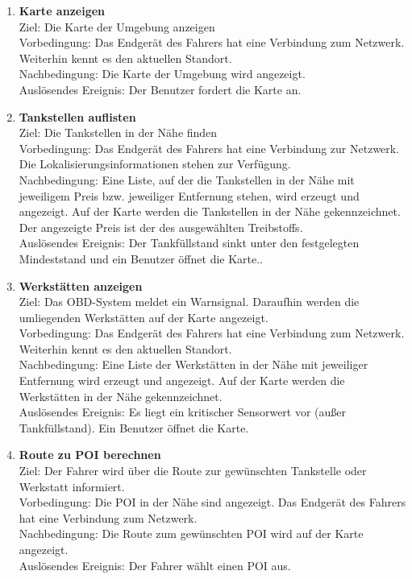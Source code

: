 \documentclass[pflichtenheft.tex]{subfiles}
\begin{document}
	\begin{enumerate}
	\setcounter{enumi}{\value{enumTemp}}
	\item{\textbf{Karte anzeigen}}
		\\Ziel: Die Karte der Umgebung anzeigen
		\\Vorbedingung: Das Endgerät des Fahrers hat eine Verbindung zum Netzwerk. Weiterhin kennt es den aktuellen Standort.
		\\Nachbedingung: Die Karte der Umgebung wird angezeigt.
  	 	\\Auslösendes Ereignis: Der Benutzer fordert die Karte an.
  	\item {\textbf{Tankstellen auflisten}}
		\\Ziel: Die Tankstellen in der Nähe finden
		\\Vorbedingung: Das Endgerät des Fahrers hat eine Verbindung zur Netzwerk.
		Die Lokalisierungsinformationen stehen zur Verfügung.
		\\Nachbedingung: Eine Liste, auf der die Tankstellen in der Nähe mit
		jeweiligem Preis bzw. jeweiliger Entfernung stehen, wird erzeugt und angezeigt. Auf der
		Karte werden die Tankstellen in der Nähe gekennzeichnet. 
		Der angezeigte Preis ist der des ausgewählten Treibstoffs.
		\\Auslösendes Ereignis: Der Tankfüllstand sinkt unter den festgelegten Mindeststand und ein Benutzer öffnet die Karte..
  	
	\item{\textbf{Werkstätten anzeigen}} 
		\\Ziel: Das OBD-System meldet ein Warnsignal. Daraufhin werden die umliegenden Werkstätten auf der Karte angezeigt.
		\\Vorbedingung: Das Endgerät des Fahrers hat eine Verbindung zum Netzwerk. Weiterhin kennt es den aktuellen Standort.
		\\Nachbedingung: Eine Liste der Werkstätten in der Nähe mit jeweiliger Entfernung wird erzeugt und angezeigt. Auf der Karte werden die Werkstätten in der Nähe gekennzeichnet. 
	 	\\Auslösendes Ereignis: Es liegt ein kritischer Sensorwert vor (außer Tankfüllstand). Ein Benutzer öffnet die Karte.
  	
  		\renewcommand{\theenumi}{/FA\ifnum \value{enumi}<10 0\fi\arabic{enumi}0W/}
		\renewcommand{\labelenumi}{\theenumi}
		\renewcommand{\theenumii}{\arabic{enumii}}
		\renewcommand{\labelenumii}{/FA\ifnum \value{enumi}<10 0\fi\arabic{enumi}\arabic{enumii}W/}

  	\item {\textbf{Route zu POI berechnen}}
  		\\Ziel: Der Fahrer wird über die Route zur gewünschten Tankstelle oder Werkstatt informiert. 
  		\\Vorbedingung: Die POI in der Nähe sind angezeigt. Das Endgerät des Fahrers hat eine Verbindung zum Netzwerk.
  		\\Nachbedingung: Die Route zum gewünschten POI wird auf der Karte angezeigt.
   		\\Auslösendes Ereignis: Der Fahrer wählt einen POI aus.


\end{enumerate}
\end{document}

